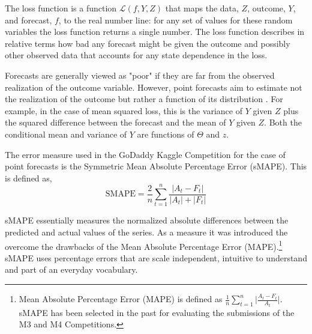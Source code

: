\documentclass[
a4paper, %
12pt, %
]{CascadeAnalyticsWPS}
\begin{document}
The loss function is a function $\mathcal{L}(f, Y, Z)$ that maps the data, $Z$, outcome, $Y$, and forecast, $f$, to the real number line: for any set of values for these random variables the loss function returns a single number. The loss function describes in relative terms how bad any forecast might be given the outcome and possibly other observed data that accounts for any state dependence in the loss.

Forecasts are generally viewed as "poor" if they are far from the observed realization of the outcome variable. However, point forecasts aim to estimate not the realization of the outcome but rather a function of its distribution \citep{elliot_2008, barrow2016}. For example, in the case of mean squared loss, this is the variance of $Y$ given $Z$ plus the squared difference between the forecast and the mean of $Y$ given $Z$. Both the conditional mean and variance of $Y$ are functions of $\Theta$ and $z$.

The error measure used in the GoDaddy Kaggle Competition for
the case of point forecasts is the Symmetric Mean Absolute Percentage Error (sMAPE). This is defined as,
\begin{equation}
\text{SMAPE} =\frac{2}{n}\sum\limits_{t=1}^{n}\frac{\big|A_{t} - F_{t}\big|}{\lvert{A_{t}}\rvert + \lvert{F_t}\rvert}
\end{equation}

sMAPE essentially measures the normalized absolute differences between the predicted and actual values of the series. As a measure it was introduced the overcome the drawbacks of the Mean Absolute Percentage Error (MAPE).\footnote{Mean Absolute Percentage Error (MAPE) is defined as $\frac{1}{n}\sum\limits_{t=1}^{n}\Bigg |\frac{A_{t} - F_{t}}{A_{t}} \Bigg |$. sMAPE has been selected in the past for evaluating the submissions of the M3 and M4 Competitions.}
sMAPE uses percentage errors that are scale independent, intuitive
to understand and part of an everyday vocabulary. 
\end{document}

